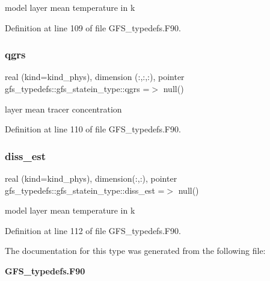 model layer mean temperature in k 



Definition at line 109 of file G\+F\+S\+\_\+typedefs.\+F90.

\mbox{\label{structgfs__typedefs_1_1gfs__statein__type_ac4f7e5b5097a7fa88b0b5dc31571dead}} 
\subsubsection{qgrs}
{\footnotesize\ttfamily real (kind=kind\+\_\+phys), dimension (\+:,\+:,\+:), pointer gfs\+\_\+typedefs\+::gfs\+\_\+statein\+\_\+type\+::qgrs =$>$ null()}



layer mean tracer concentration 



Definition at line 110 of file G\+F\+S\+\_\+typedefs.\+F90.

\mbox{\label{structgfs__typedefs_1_1gfs__statein__type_a6e901242aed55ce5fbc9ec426fa53d26}} 
\subsubsection{diss\+\_\+est}
{\footnotesize\ttfamily real (kind=kind\+\_\+phys), dimension(\+:,\+:), pointer gfs\+\_\+typedefs\+::gfs\+\_\+statein\+\_\+type\+::diss\+\_\+est =$>$ null()}



model layer mean temperature in k 



Definition at line 112 of file G\+F\+S\+\_\+typedefs.\+F90.



The documentation for this type was generated from the following file\+:\begin{DoxyCompactItemize}
\item 
\textbf{ G\+F\+S\+\_\+typedefs.\+F90}\end{DoxyCompactItemize}
